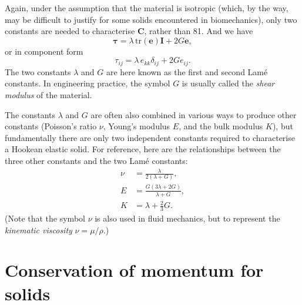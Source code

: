\documentclass[twoside,11pt]		{report}
\begin{document}
Again, under the assumption that the material is isotropic (which, by
the way, may be difficult to justify for some solids encountered in
biomechanics), only two constants are needed to characterise $\bm{C}$,
rather than 81. And we have
\begin{equation}
\bm{\tau}=\lambda\,\mathrm{tr}(\bm{e})\bm{I} + 2G\bm{e},
\label{eq.hookes}
\end{equation}
or in component form
\begin{equation}
\tau_{ij} = \lambda\,e_{kk}\delta_{ij} + 2Ge_{ij}.
\end{equation}
The two constants $\lambda$ and $G$ are here known as the first and
second Lam\'{e} constants. In engineering practice, the symbol $G$ is
usually called the \emph{shear modulus} of the material.

The constants $\lambda$ and $G$ are often also combined in various
ways to produce other constants (Poisson's ratio $\nu$, Young's
modulus $E$, and the bulk modulus $K$), but fundamentally there are
only two independent constants required to characterise a Hookean
elastic solid. For reference, here are the relationships between the
three other constants and the two Lam\'{e} constants:
\begin{eqnarray*}
{\nu} &=\frac{\lambda}{2(\lambda + G)},\\
E   &=\frac{G(3\lambda+2G)}{\lambda+G},\\
K   &=\lambda + \frac{2}{3} G.
\end{eqnarray*}
(Note that the symbol $\nu$ is also used in fluid mechanics, but to
represent the \emph{kinematic viscosity} $\nu=\mu/\rho$.)


\section{Conservation of momentum for solids}
\end{document}
